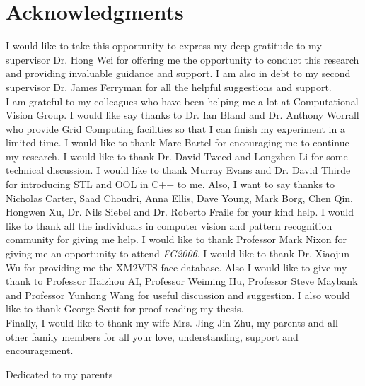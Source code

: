 \chapter*{Acknowledgments}
{\parindent 0pt
I would like to take this opportunity to express my deep gratitude to my supervisor Dr. Hong Wei for offering me the opportunity to conduct this research and providing invaluable guidance and support. I am also in debt to my second supervisor Dr. James Ferryman for all the helpful suggestions and support.\\

I am grateful to my colleagues who have been helping me a lot at Computational Vision Group. I would like say thanks to Dr. Ian Bland and Dr. Anthony Worrall who provide Grid Computing facilities so that I can finish my experiment in a limited time. I would like to thank Marc Bartel for encouraging me to continue my research. I would like to thank Dr. David Tweed and Longzhen Li for some technical discussion. I would like to thank Murray Evans and Dr. David Thirde for introducing STL and OOL in C++ to me. Also, I want to say thanks to Nicholas Carter, Saad Choudri, Anna Ellis, Dave Young, Mark Borg, Chen Qin, Hongwen Xu, Dr. Nils Siebel and Dr. Roberto Fraile for your kind help. I would like to thank all the individuals in computer vision and pattern recognition community for giving me help. I would like to thank Professor Mark Nixon for giving me an opportunity to attend \textit{FG2006}. I would like to thank Dr. Xiaojun Wu for providing me the \mbox{XM2VTS} face database. Also I would like to give my thank to Professor Haizhou AI, Professor Weiming Hu, Professor Steve Maybank and Professor Yunhong Wang for useful discussion and suggestion. I also would like to thank George Scott for proof reading my thesis.\\

Finally, I would like to thank my wife Mrs. Jing Jin Zhu, my parents and all other family members for all your love, understanding, support and encouragement.}


\newpage
\thispagestyle{empty}
\begin{center}
 \vspace*{2cm}
 Dedicated to my parents
\end{center}